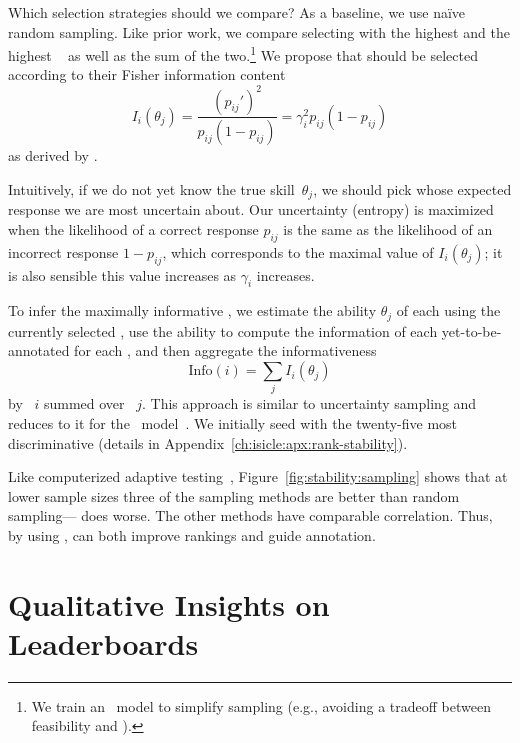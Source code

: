 Which \itm{} selection strategies should we compare?
As a baseline, we use na\"ive random sampling.
Like prior work, we compare selecting \itms{} with the highest \diff{} and the highest \discability{}~\citep{lalor2019latent} as well as the sum of the two.\footnote{We train an ~model to simplify sampling (e.g., avoiding a tradeoff between feasibility and \discability{}).}
We propose that \itms{} should be selected according to their Fisher information content~\citep{weiss1982info}
\begin{equation}
    \label{eq:info}
    I_i(\theta_j)=\frac{(p_{ij}')^2}{p_{ij}(1-p_{ij})}=\gamma_i^2 p_{ij}(1-p_{ij})
\end{equation} as derived by \citet[p. 70]{lord1968test}.

Intuitively, if we do not yet know the true skill~$\theta_j$, we should pick \itms{} whose expected response we are most uncertain about.
Our uncertainty (entropy) is maximized when the likelihood of a correct response $p_{ij}$ is the same as the likelihood of an incorrect response $1-p_{ij}$, which corresponds to the maximal value of $I_i(\theta_j)$; it is also sensible this value increases as \discability{} $\gamma_i$ increases.

To infer the maximally informative \itms{}, we estimate the ability
$\theta_j$ of each \subj{} using the currently selected \itms{}, use
the ability to compute the information
of each yet-to-be-annotated \itm{} for each \subj{}, and then aggregate the informativeness
\begin{equation}
    \text{Info}(i)=\sum_j I_i(\theta_j)
\end{equation}
by \itm{}~$i$ summed over \subjs{}~$j$.
This approach is similar to uncertainty sampling and reduces to it for the ~model~\citep{lewis1994uncertainty}.
We initially seed with the twenty-five most discriminative \itms{} (details in Appendix~\ref{ch:isicle:apx:rank-stability}).

Like computerized adaptive testing~\citep{moreno1984cat}, Figure~\ref{fig:stability:sampling} shows that at lower sample sizes three of the \irt{} sampling methods are better than random sampling---\diff{} does worse.
The other \irt{} methods have comparable correlation.
Thus, by using \irt{}, \name{} can both improve rankings and guide annotation.
\section{Qualitative Insights on Leaderboards}
\label{ch:isicle:interp}

